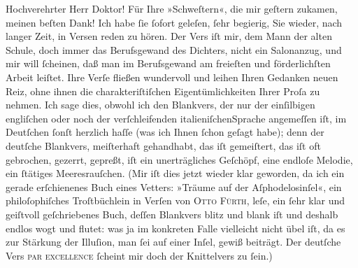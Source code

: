 \pstart\center{}Hochverehrter Herr Doktor!\pend\vspace{0.5em}
\pstart
           Für Ihre »Schweſtern«, die mir geſtern zukamen,
               meinen beſten Dank! Ich habe{ }ſie{ }ſofort geleſen,{ }ſehr begierig, Sie wieder, nach
               langer Zeit, in Versen reden zu hören. Der Vers iſt mir, dem Mann der alten Schule,
               doch immer das Berufsgewand des Dichters, nicht ein Salonanzug, und mir will{ }ſcheinen, daß man im Berufsgewand am freieſten und förderlichſten Arbeit leiſtet.
               Ihre Verſe fließen wundervoll und leihen Ihren Gedanken neuen Reiz, ohne ihnen die
               charakteriſtiſchen Eigentümlichkeiten Ihrer Proſa zu nehmen. Ich sage dies, obwohl
               ich den Blankvers, der nur der einſilbigen engliſchen oder noch der verſchleifenden italieniſchenSprache angemeſſen iſt, im Deutſchen{ }ſonſt herzlich
               haſſe (was ich Ihnen{ }ſchon geſagt habe); denn der deutſche Blankvers, mei{\pb}ſterhaft gehandhabt, das iſt gemeiſtert,
               das iſt oft gebrochen, gezerrt, gepreßt, iſt ein unerträgliches Geſchöpf, eine
               endloſe Melodie, ein{ }ſtätiges Meeresrauſchen. (Mir iſt dies jetzt wieder klar
               geworden, da ich ein gerade erſchienenes Buch eines Vetters: »Träume auf der Aſphodelosinſel«, ein philoſophiſches
               Troſtbüchlein in Verſen von \textsc{Otto Fürth}, leſe, ein{ }ſehr klar und geiſtvoll geſchriebenes Buch, deſſen Blankvers blitz
               und blank iſt und deshalb endlos wogt und flutet: was ja im konkreten Falle
               vielleicht nicht übel iſt, da es zur Stärkung der Illuſion, man{ }ſei auf einer Inſel,
               gewiß beiträgt. Der deutſche Vers \textsc{par excellence}{ }ſcheint mir doch der Knittelvers zu{ }ſein.)\pend
           
